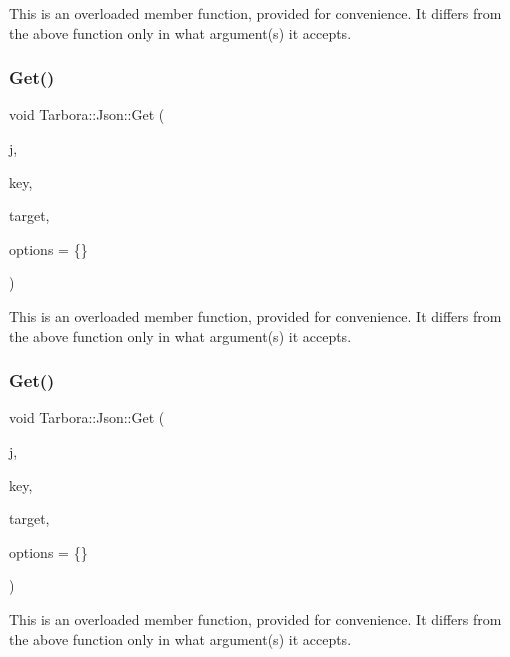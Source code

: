 This is an overloaded member function, provided for convenience. It differs from the above function only in what argument(s) it accepts. \mbox{\label{classTarbora_1_1Json_aa5b6c3dbf5e587e9bf4bfd6880b14f16}} 
\subsubsection{\texorpdfstring{Get()}{Get()}\hspace{0.1cm}{\footnotesize\ttfamily [10/18]}}
{\footnotesize\ttfamily void Tarbora\+::\+Json\+::\+Get (\begin{DoxyParamCaption}\item[{raw\+\_\+json}]{j,  }\item[{const char $\ast$}]{key,  }\item[{float $\ast$}]{target,  }\item[{\hyperlink{structTarbora_1_1JsonOptions}{Json\+Options}}]{options = {\ttfamily \{\}} }\end{DoxyParamCaption})}

This is an overloaded member function, provided for convenience. It differs from the above function only in what argument(s) it accepts. \mbox{\label{classTarbora_1_1Json_a5cb7ad199c7f33a82f8602e74ea246eb}} 
\subsubsection{\texorpdfstring{Get()}{Get()}\hspace{0.1cm}{\footnotesize\ttfamily [11/18]}}
{\footnotesize\ttfamily void Tarbora\+::\+Json\+::\+Get (\begin{DoxyParamCaption}\item[{raw\+\_\+json}]{j,  }\item[{const char $\ast$}]{key,  }\item[{unsigned int $\ast$}]{target,  }\item[{\hyperlink{structTarbora_1_1JsonOptions}{Json\+Options}}]{options = {\ttfamily \{\}} }\end{DoxyParamCaption})}

This is an overloaded member function, provided for convenience. It differs from the above function only in what argument(s) it accepts. \mbox{\label{classTarbora_1_1Json_a9a8713a7b0fec22135c38ed52d8018bd}} 
